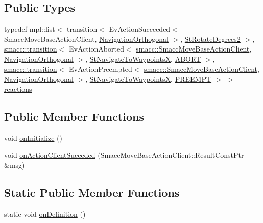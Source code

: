 \subsection*{Public Types}
\begin{DoxyCompactItemize}
\item 
typedef mpl\+::list$<$ transition$<$ Ev\+Action\+Succeeded$<$ Smacc\+Move\+Base\+Action\+Client, \hyperlink{classsm__dance__bot_1_1NavigationOrthogonal}{Navigation\+Orthogonal} $>$, \hyperlink{structsm__dance__bot_1_1StRotateDegrees2}{St\+Rotate\+Degrees2} $>$, \hyperlink{classsmacc_1_1transition}{smacc\+::transition}$<$ Ev\+Action\+Aborted$<$ \hyperlink{classsmacc_1_1SmaccMoveBaseActionClient}{smacc\+::\+Smacc\+Move\+Base\+Action\+Client}, \hyperlink{classsm__dance__bot_1_1NavigationOrthogonal}{Navigation\+Orthogonal} $>$, \hyperlink{structsm__dance__bot_1_1StNavigateToWaypointsX}{St\+Navigate\+To\+WaypointsX}, \hyperlink{classABORT}{A\+B\+O\+RT} $>$, \hyperlink{classsmacc_1_1transition}{smacc\+::transition}$<$ Ev\+Action\+Preempted$<$ \hyperlink{classsmacc_1_1SmaccMoveBaseActionClient}{smacc\+::\+Smacc\+Move\+Base\+Action\+Client}, \hyperlink{classsm__dance__bot_1_1NavigationOrthogonal}{Navigation\+Orthogonal} $>$, \hyperlink{structsm__dance__bot_1_1StNavigateToWaypointsX}{St\+Navigate\+To\+WaypointsX}, \hyperlink{classPREEMPT}{P\+R\+E\+E\+M\+PT} $>$ $>$ \hyperlink{structsm__dance__bot_1_1StNavigateForward1_a444670aefb79b460181dd41dba6a4432}{reactions}
\end{DoxyCompactItemize}
\subsection*{Public Member Functions}
\begin{DoxyCompactItemize}
\item 
void \hyperlink{structsm__dance__bot_1_1StNavigateForward1_aca9caa8bd74d17b2d735db4cfb3cfe4c}{on\+Initialize} ()
\item 
void \hyperlink{structsm__dance__bot_1_1StNavigateForward1_a182b23337261f2887307d935066cd156}{on\+Action\+Client\+Succeded} (Smacc\+Move\+Base\+Action\+Client\+::\+Result\+Const\+Ptr \&msg)
\end{DoxyCompactItemize}
\subsection*{Static Public Member Functions}
\begin{DoxyCompactItemize}
\item 
static void \hyperlink{structsm__dance__bot_1_1StNavigateForward1_a81efc621988f772ae4de92ab9e3130b7}{on\+Definition} ()
\end{DoxyCompactItemize}
